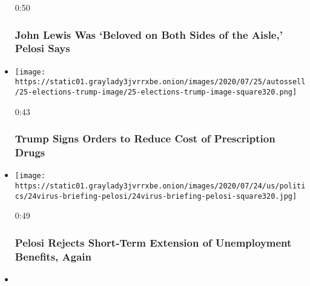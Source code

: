 \begin{itemize}
  0:50

  \hypertarget{john-lewis-was-beloved-on-both-sides-of-the-aisle-pelosi-says}{%
  \subsubsection{John Lewis Was `Beloved on Both Sides of the Aisle,'
  Pelosi
  Says}\label{john-lewis-was-beloved-on-both-sides-of-the-aisle-pelosi-says}}
\item
  \href{https://www.nytimes3xbfgragh.onion/video/us/100000007255909/trump-executive-order-prescription-drugs.html?action=click\&module=video-series-bar\&region=header\&pgtype=Article\&playlistId=video/us-politics}{}

  \texttt{[image: https://static01.graylady3jvrrxbe.onion/images/2020/07/25/autossell/25-elections-trump-image/25-elections-trump-image-square320.png]}

  0:43

  \hypertarget{trump-signs-orders-to-reduce-cost-of-prescription-drugs}{%
  \subsubsection{Trump Signs Orders to Reduce Cost of Prescription
  Drugs}\label{trump-signs-orders-to-reduce-cost-of-prescription-drugs}}
\item
  \href{https://www.nytimes3xbfgragh.onion/video/us/100000007256158/pelosi-rejects-unemployment-extension.html?action=click\&module=video-series-bar\&region=header\&pgtype=Article\&playlistId=video/us-politics}{}

  \texttt{[image: https://static01.graylady3jvrrxbe.onion/images/2020/07/24/us/politics/24virus-briefing-pelosi/24virus-briefing-pelosi-square320.jpg]}

  0:49

  \hypertarget{pelosi-rejects-short-term-extension-of-unemployment-benefits-again}{%
  \subsubsection{Pelosi Rejects Short-Term Extension of Unemployment
  Benefits,
  Again}\label{pelosi-rejects-short-term-extension-of-unemployment-benefits-again}}
\item
  \href{https://www.nytimes3xbfgragh.onion/video/us/100000007243995/portland-protests-federal-government.html?action=click\&module=video-series-bar\&region=header\&pgtype=Article\&playlistId=video/us-politics}{}


\end{itemize}
